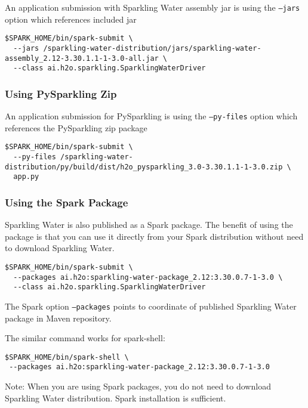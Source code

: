 An application submission with Sparkling Water assembly jar is using the \texttt{--jars} option which references included jar

\pagebreak
\begin{lstlisting}[style=Bash]
$SPARK_HOME/bin/spark-submit \
  --jars /sparkling-water-distribution/jars/sparkling-water-assembly_2.12-3.30.1.1-1-3.0-all.jar \
  --class ai.h2o.sparkling.SparklingWaterDriver
\end{lstlisting}

\subsubsection{Using PySparkling Zip}
An application submission for PySparkling is using the \texttt{--py-files} option which references the PySparkling
zip package

\begin{lstlisting}[style=Bash]
$SPARK_HOME/bin/spark-submit \
  --py-files /sparkling-water-distribution/py/build/dist/h2o_pysparkling_3.0-3.30.1.1-1-3.0.zip \
  app.py
\end{lstlisting}

\subsubsection{Using the Spark Package}

Sparkling Water is also published as a Spark package. The benefit of using the package is that you can use it directly
from your Spark distribution without need to download Sparkling Water.

\begin{lstlisting}[style=Bash]
$SPARK_HOME/bin/spark-submit \
  --packages ai.h2o:sparkling-water-package_2.12:3.30.0.7-1-3.0 \
  --class ai.h2o.sparkling.SparklingWaterDriver
\end{lstlisting}

The Spark option \texttt{--packages} points to coordinate of published Sparkling Water package in Maven repository.

The similar command works for spark-shell:

\begin{lstlisting}[style=Bash]
$SPARK_HOME/bin/spark-shell \
 --packages ai.h2o:sparkling-water-package_2.12:3.30.0.7-1-3.0
\end{lstlisting}

Note: When you are using Spark packages, you do not need to download Sparkling Water distribution. Spark installation is sufficient.

